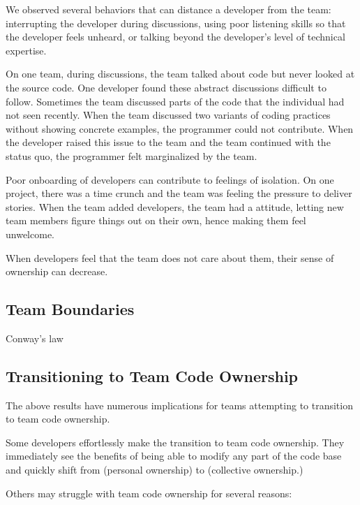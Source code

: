 We observed several behaviors that can distance a developer from the team: interrupting the developer during discussions, using poor listening skills so that the developer feels unheard, or talking beyond the developer’s level of technical expertise. 

On one team, during discussions, the team talked about code but never looked at the source code. One developer found these abstract discussions difficult to follow. Sometimes the team discussed parts of the code that the individual had not seen recently. When the team discussed two variants of coding practices without showing concrete examples, the programmer could not contribute. When the developer raised this issue to the team and the team continued with the status quo, the programmer felt marginalized by the team.

Poor onboarding of developers can contribute to feelings of isolation. On one project, there was a time crunch and the team was feeling the pressure to deliver stories. When the team added developers, the team had a  attitude, letting new team members figure things out on their own, hence making them feel unwelcome.

When developers feel that the team does not care about them, their sense of ownership can decrease.

\subsection{Team Boundaries}

Conway’s law

\subsection{Transitioning to Team Code Ownership}
\label{Transitioning}

The above results have numerous implications for teams attempting to transition to team code ownership. 

Some developers effortlessly make the transition to team code ownership. They immediately see the benefits of being able to modify any part of the code base and quickly shift from  (personal ownership) to  (collective ownership.)

Others may struggle with team code ownership for several reasons:

